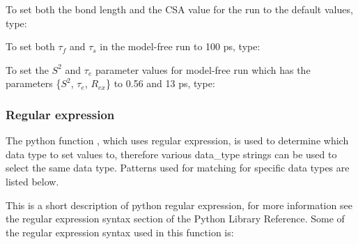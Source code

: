 To set both the bond length and the CSA value for the run 
 to the default values, type:




To set both $\tau_f$ and $\tau_s$ in the model-free run 
 to 100 ps, type:





To set the $S^2$ and $\tau_e$ parameter values for model-free run 
 which has the parameters
\{$S^2$, $\tau_e$, $R_{ex}$\} to 0.56 and 13 ps, type:








\subsubsection{Regular expression}

The python function 
, which uses regular expression, is used to determine which data
type to set values to, therefore various data\_type strings can be used to select the same
data type.  Patterns used for matching for specific data types are listed below.

This is a short description of python regular expression, for more information see the
regular expression syntax section of the Python Library Reference.  Some of the regular
expression syntax used in this function is:

